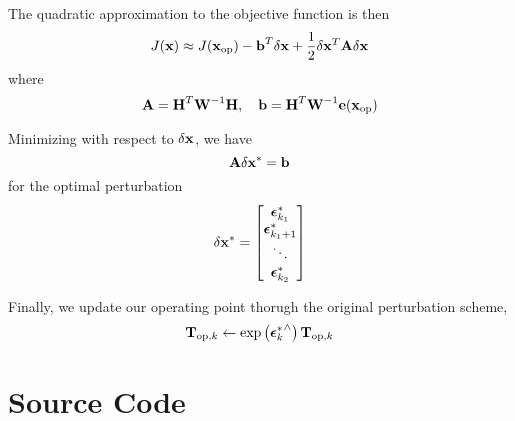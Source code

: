 \documentclass[a4paper]{article}
\begin{document}
The quadratic approximation to the objective function is then
\begin{equation}
    J(\bm{\mathbf{x}}) \approx J(\bm{\mathbf{x}}_{\text{op}}) - \bm{\mathbf{b}}^T \delta \bm{\mathbf{x}} + \dfrac{1}{2} \delta \bm{\mathbf{x}}^T \bm{\mathbf{A}} \delta \bm{\mathbf{x}}
\end{equation}
where
\begin{equation}
    \bm{\mathbf{A}} = \bm{\mathbf{H}}^T \bm{\mathbf{W}}^{-1}\bm{\mathbf{H}}, \quad \bm{\mathbf{b}} = \bm{\mathbf{H}}^T \bm{\mathbf{W}}^{-1} \bm{\mathbf{e}}(\bm{\mathbf{x}}_{\text{op}})
\end{equation}

Minimizing with respect to $\delta \bm{\mathbf{x}}$, we have 
\begin{equation}
    \bm{\mathbf{A}} \delta \bm{\mathbf{x}}^* = \bm{\mathbf{b}}
\end{equation}
for the optimal perturbation
\begin{equation}
    \delta \bm{\mathbf{x}}^* = \begin{bmatrix}
      \bm{\mathbf{\epsilon}}_{k_1}^* \\ \bm{\mathbf{\epsilon}}_{k_1+1}^* \\ \ddots \\ \bm{\mathbf{\epsilon}}_{k_2}^*
    \end{bmatrix}
\end{equation}

Finally, we update our operating point thorugh the original perturbation scheme,
\begin{equation}
    \bm{\mathbf{T}}_{\text{op}, k} \leftarrow \exp\left( {\bm{\mathbf{\epsilon}}_k^*}^{\wedge} \right) \bm{\mathbf{T}}_{\text{op}, k}
\end{equation}


\clearpage
\printbibliography

\appendix

\clearpage
\section{Source Code}
\label{sourcecode}
\end{document}
